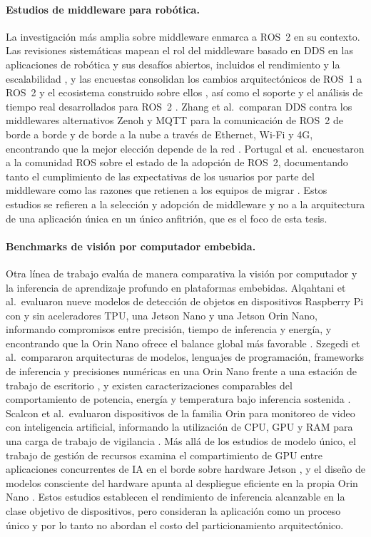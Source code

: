 \paragraph{Estudios de middleware para robótica.}
La investigación más amplia sobre middleware enmarca a ROS~2 en su contexto.
Las revisiones sistemáticas mapean el rol del middleware basado en DDS en
las aplicaciones de robótica y sus desafíos abiertos, incluidos el
rendimiento y la escalabilidad \cite{gambo2025}, y las encuestas consolidan
los cambios arquitectónicos de ROS~1 a ROS~2 y el ecosistema construido
sobre ellos \cite{al-batati2026}, así como el soporte y el análisis de
tiempo real desarrollados para ROS~2 \cite{casini2026}. Zhang et al.\
comparan DDS contra los middlewares alternativos Zenoh y MQTT para la
comunicación de ROS~2 de borde a borde y de borde a la nube a través de
Ethernet, Wi-Fi y 4G, encontrando que la mejor elección depende de la red
\cite{zhang2024}. Portugal et al.\ encuestaron a la comunidad ROS sobre el
estado de la adopción de ROS~2, documentando tanto el cumplimiento de las
expectativas de los usuarios por parte del middleware como las razones que
retienen a los equipos de migrar \cite{portugal2025}. Estos estudios se
refieren a la selección y adopción de middleware y no a la arquitectura de
una aplicación única en un único anfitrión, que es el foco de esta tesis.

\paragraph{Benchmarks de visión por computador embebida.}
Otra línea de trabajo evalúa de manera comparativa la visión por computador
y la inferencia de aprendizaje profundo en plataformas embebidas. Alqahtani
et al.\ evaluaron nueve modelos de detección de objetos en dispositivos
Raspberry Pi con y sin aceleradores TPU, una Jetson Nano y una Jetson Orin
Nano, informando compromisos entre precisión, tiempo de inferencia y
energía, y encontrando que la Orin Nano ofrece el balance global más
favorable \cite{alqahtani2026}. Szegedi et al.\ compararon arquitecturas de
modelos, lenguajes de programación, frameworks de inferencia y precisiones
numéricas en una Orin Nano frente a una estación de trabajo de escritorio
\cite{szegedi2026}, y existen caracterizaciones comparables del
comportamiento de potencia, energía y temperatura bajo inferencia sostenida
\cite{zequn2026}. Scalcon et al.\ evaluaron dispositivos de la familia Orin
para monitoreo de video con inteligencia artificial, informando la
utilización de CPU, GPU y RAM para una carga de trabajo de vigilancia
\cite{scalcon2024}. Más allá de los estudios de modelo único, el trabajo de
gestión de recursos examina el compartimiento de GPU entre aplicaciones
concurrentes de IA en el borde sobre hardware Jetson \cite{woo2025}, y el
diseño de modelos consciente del hardware apunta al despliegue eficiente en
la propia Orin Nano \cite{aalishah2025}. Estos estudios establecen el
rendimiento de inferencia alcanzable en la clase objetivo de dispositivos,
pero consideran la aplicación como un proceso único y por lo tanto no
abordan el costo del particionamiento arquitectónico.


